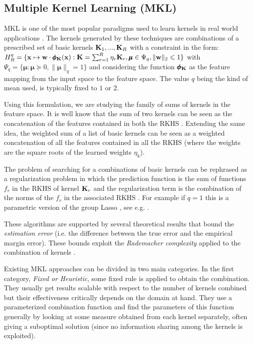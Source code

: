 \documentclass{esannV2}
\newcommand{\xx}{{\bf x}}
\newcommand{\KK}{{\bf K}}
\newcommand{\1}{{\bf 1}}
\newcommand{\mmu}{\pmb{\mu}}
\newcommand{\pphi}{\pmb{\phi}}
\begin{document}
\subsection{Multiple Kernel Learning (MKL)}
\label{MKL}
MKL \cite{Bach2004,Gonen2011} is one of the most popular paradigms used to learn kernels in real world applications \cite{Bucak2014,Castro2014}. %
The kernels generated by these techniques are combinations of a prescribed set of basic kernels $\KK_1,...,\KK_R$ with a constraint in the form:
$
	H_R^q = \{ \xx \mapsto \textbf{w} \cdot \pphi_\KK(\xx) : \KK = \sum_{r=1}^R \eta_r \KK_r, \mmu \in \Psi_q, \|\textbf{w}\|_2 \leqslant 1 \}
$
with $\Psi_q = \{ \mmu : \mmu \succcurlyeq 0, \| \mmu \|_q = 1 \}$ and considering the function $\pphi_\KK$ as the feature mapping from the input space to the feature space. The value $q$ being the kind of mean used, is typically fixed to $1$ or $2$.

Using this formulation, we are studying the family of sums of kernels in the feature space. It is well know that the sum of two kernels can be seen as the concatenation of the features contained in both the RKHS \cite{Shawe-Taylor2004}. Extending the same idea, the weighted sum of a list of basic kernels can be seen as a weighted concatenation of all the features contained in all the RKHS (where the weights are the square roots of the learned weights $\eta_k$).

The problem of searching for a combinations of basic kernels can be rephrased as a regularization problem in which the prediction function is the sum of functions $f_r$ in the RKHS of kernel $\KK_r$ and the regularization term is the combination of the norms of the $f_r$ in the associated RKHS \cite{Micchelli2005a}. %
For example if $q=1$ this is a parametric version of the group Lasso \cite{Meier2009}, see e.g. \cite{Maurer2012}.

These algorithms are supported by several theoretical results that bound the \emph{estimation error} (i.e. the difference between the true error and the empirical margin error). These bounds exploit the \emph{Rademacher complexity} applied to the combination of kernels \cite{Maurer2012,Srebro2006,Cortes2009c,Hussain2011,Hussain2011a}. %

Existing MKL approaches can be divided in two main categories. In the first category, \emph{Fixed or Heuristic}, some fixed rule is applied to obtain the combination. They usually get results scalable with respect to the number of kernels combined but their effectiveness critically depends on the domain at hand. They use a parameterized combination function and find the parameters of this function generally by looking at some measure obtained from each kernel separately,  often giving a suboptimal solution (since no information sharing among the kernels is exploited).
\end{document}
